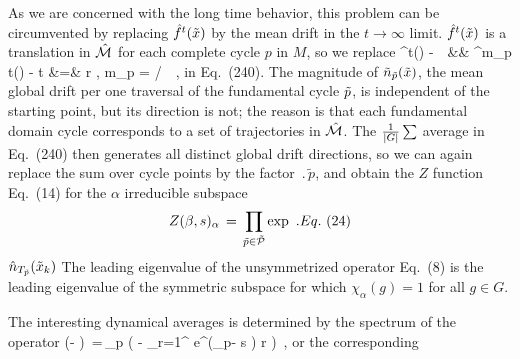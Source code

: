  As we are concerned with the long time behavior,
 this problem can be circumvented
 by replacing $ \hat f^t(\tilde x{}) $ by the mean
 drift in the $t \rightarrow \infty$ limit.
 $ \hat f^t(\tilde x{}) $ is a translation in $\hat {{\cal M}}$ for each
 complete cycle $p$ in $M$, so we replace
 \bea
 \hf^t(\tx{\tpk}) - \tx{\tpk}
 \,\Longrightarrow \,
 &&
 { { \hf^{m_p t}(\tx{\tpk}) - \tx{\tpk} }
 }
 \continue
t &=& r , \quad m_p = / \quad \tx \in \tp \,\, ,
 \eea
 in Eq.~(240).
 The magnitude of ${\tilde n}_{{\tilde p}}(\tilde x{})$, the mean
 global drift per one traversal of the fundamental cycle ${\tilde p}$, is
 independent of the starting point, but its direction is not; the
 reason is that each fundamental domain cycle corresponds to a set of
 trajectories in $\hat {{\cal M}}$.
 The ${1 \over {|G|}} \sum$ average in
 Eq.~(240) then generates all distinct global drift
 directions, so we can again replace the
 sum over cycle points by the factor $\period{\tilde{p}}$, and obtain the
 $Z$ function Eq.~(14) for the $\alpha $ irreducible subspace
 $$
 Z(\beta,s)_\alpha\,=\,\prod_{{\tilde p} \in \tilde{\cal{P}} } \exp
 \,\, .
 Eq.~(24)
 $$
 $\hat{n}_{{T_{\tilde{p}}}}(\tilde x_k)$
 The leading eigenvalue of the
unsymmetrized
 operator Eq.~(8) is
 the leading eigenvalue of the symmetric subspace for which
 $\chi_\alpha(g)=1$ for all $g \in G$.

The interesting dynamical averages is determined by the spectrum of the operator
\beq \det(\eigenvL - \Lop) \,=\,\prod_{p} \exp \left(
  - { \sum_{r=1}^ { e^{(\beta \cdot \hn_p- s
        ) r} \over {} }
  } \right) \,,
or the corresponding \dzeta\
